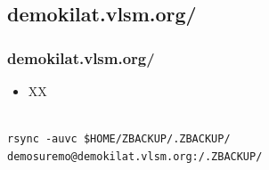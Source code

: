 \documentclass[xcolor=table, notheorems, hyperref={pdfpagelabels=false}]{beamer}
\begin{document}
\begin{frame}[fragile]
\section{demokilat.vlsm.org/}
\frametitle{demokilat.vlsm.org/}
\begin{itemize}
\item XX
\end{itemize}

\begin{lstlisting}[basicstyle=\ttfamily\large]

rsync -auvc $HOME/ZBACKUP/.ZBACKUP/ demosuremo@demokilat.vlsm.org:/.ZBACKUP/

\end{lstlisting}

\end{frame}

\end{document}
